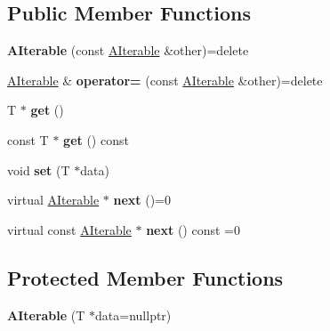 \subsection*{Public Member Functions}
\begin{DoxyCompactItemize}
\item 
\mbox{\label{classwood_box_1_1utility_1_1_a_iterable_aa8f6eb12adefa838343af8d8854ac7f6}} 
{\bfseries A\+Iterable} (const \mbox{\hyperlink{classwood_box_1_1utility_1_1_a_iterable}{A\+Iterable}} \&other)=delete
\item 
\mbox{\label{classwood_box_1_1utility_1_1_a_iterable_a9dfe1e1906628ef0892b50d12ba8696a}} 
\mbox{\hyperlink{classwood_box_1_1utility_1_1_a_iterable}{A\+Iterable}} \& {\bfseries operator=} (const \mbox{\hyperlink{classwood_box_1_1utility_1_1_a_iterable}{A\+Iterable}} \&other)=delete
\item 
\mbox{\label{classwood_box_1_1utility_1_1_a_iterable_a1ae4da148f184a6e95649c2e967389aa}} 
T $\ast$ {\bfseries get} ()
\item 
\mbox{\label{classwood_box_1_1utility_1_1_a_iterable_a675dfb37558f14704afeb50ab544f99f}} 
const T $\ast$ {\bfseries get} () const
\item 
\mbox{\label{classwood_box_1_1utility_1_1_a_iterable_ae8978938416061fcfa2180ba2cd7f48c}} 
void {\bfseries set} (T $\ast$data)
\item 
\mbox{\label{classwood_box_1_1utility_1_1_a_iterable_a3ddc252101ff34784456f0a3d712f4df}} 
virtual \mbox{\hyperlink{classwood_box_1_1utility_1_1_a_iterable}{A\+Iterable}} $\ast$ {\bfseries next} ()=0
\item 
\mbox{\label{classwood_box_1_1utility_1_1_a_iterable_a7d3afa98e4226f54e5b9671adec5d0ae}} 
virtual const \mbox{\hyperlink{classwood_box_1_1utility_1_1_a_iterable}{A\+Iterable}} $\ast$ {\bfseries next} () const =0
\end{DoxyCompactItemize}
\subsection*{Protected Member Functions}
\begin{DoxyCompactItemize}
\item 
\mbox{\label{classwood_box_1_1utility_1_1_a_iterable_a9db8d4d69d94a3e0f230a6f9e8118c20}} 
{\bfseries A\+Iterable} (T $\ast$data=nullptr)
\end{DoxyCompactItemize}


